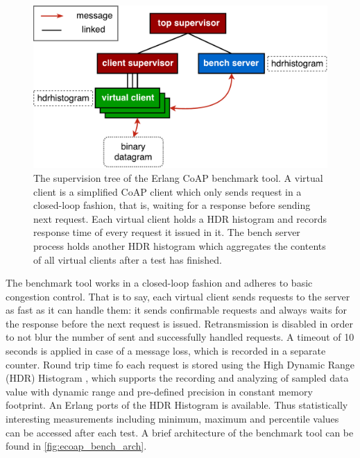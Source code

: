 \begin{figure}[!htbp]
\centering
\includegraphics[scale = 0.55]{ecoap_bench_arch}
\caption[The supervision tree of the Erlang CoAP benchmark tool]{The supervision tree of the Erlang CoAP benchmark tool. A virtual client is a simplified CoAP client which only sends request in a closed-loop fashion, that is, waiting for a response before sending next request. Each virtual client holds a HDR histogram and records response time of every request it issued in it. The bench server process holds another HDR histogram which aggregates the contents of all virtual clients after a test has finished.}
\label{fig:ecoap_bench_arch}
\end{figure}

The benchmark tool works in a closed-loop fashion and adheres to basic congestion control. That is to say, each virtual client sends requests to the server as fast as it can handle them: it sends confirmable requests and always waits for the response before the next request is issued. Retransmission is disabled in order to not blur the number of sent and successfully handled requests. A timeout of 10 seconds is applied in case of a message loss, which is recorded in a separate counter. Round trip time fo each request is stored using the High Dynamic Range (HDR) Histogram \cite{hdr_erl}, which supports the recording and analyzing of sampled data value with dynamic range and pre-defined precision in constant memory footprint. An Erlang ports of the HDR Histogram is available. Thus statistically interesting measurements including minimum, maximum and percentile values can be accessed after each test. A brief architecture of the benchmark tool can be found in \autoref{fig:ecoap_bench_arch}.


